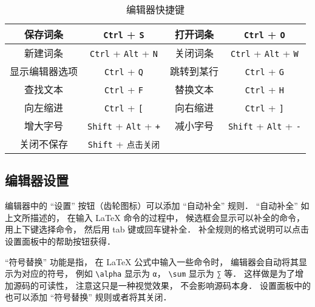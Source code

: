 \begin{table}[ht]
\centering
\caption{编辑器快捷键}\label{editor_tab1}
\begin{tabular}{|c|c|c|c|}
\hline
保存词条 & \verb|Ctrl| + \verb|S| & 打开词条 & \verb|Ctrl| + \verb|O| \\
\hline
新建词条 & \verb|Ctrl| + \verb|Alt| + \verb|N| & 关闭词条 & \verb|Ctrl| + \verb|Alt| + \verb|W| \\
\hline
显示编辑器选项 & \verb|Ctrl| + \verb|Q| & 跳转到某行 & \verb|Ctrl| + \verb|G| \\
\hline
查找文本 & \verb|Ctrl| + \verb|F| & 替换文本 & \verb|Ctrl| + \verb|H| \\
\hline
向左缩进 & \verb|Ctrl| + \verb|[| & 向右缩进 & \verb|Ctrl| + \verb|]| \\
\hline
增大字号 & \verb|Shift| + \verb|Alt| + \verb|+| & 减小字号 & \verb|Shift| + \verb|Alt| + \verb|-| \\
\hline
关闭不保存 & \verb|Shift| + \verb|点击关闭| &  &  \\
\hline
\end{tabular}
\end{table}

\subsection{编辑器设置}
编辑器中的 “设置” 按钮（齿轮图标）可以添加 “自动补全” 规则． “自动补全” 如上文所描述的， 在输入 LaTeX 命令的过程中， 候选框会显示可以补全的命令， 用上下键选择命令， 然后用 tab 键或回车键补全． 补全规则的格式说明可以点击设置面板中的帮助按钮获得．

“符号替换” 功能是指， 在 LaTeX 公式中输入一些命令时， 编辑器会自动将其显示为对应的符号， 例如 \verb|\alpha| 显示为 \lstinline|α|， \verb|\sum| 显示为 \lstinline|∑| 等． 这样做是为了增加源码的可读性， 注意这只是一种视觉效果， 不会影响源码本身． 设置面板中的也可以添加 “符号替换” 规则或者将其关闭．

